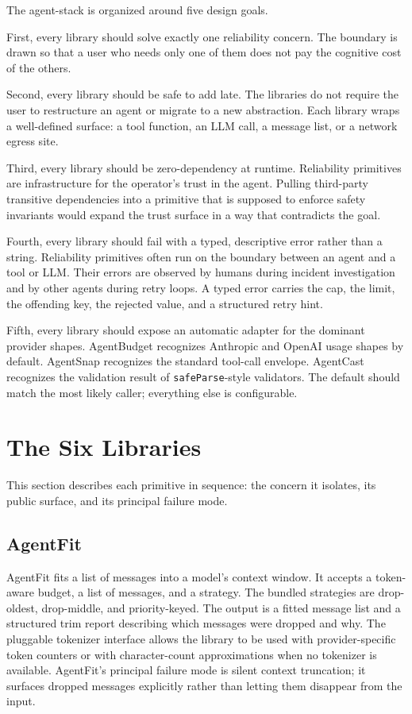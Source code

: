 \documentclass[11pt]{article}
\begin{document}
The agent-stack is organized around five design goals.

First, every library should solve exactly one reliability concern. The boundary is drawn so that a user who needs only one of them does not pay the cognitive cost of the others.

Second, every library should be safe to add late. The libraries do not require the user to restructure an agent or migrate to a new abstraction. Each library wraps a well-defined surface: a tool function, an LLM call, a message list, or a network egress site.

Third, every library should be zero-dependency at runtime. Reliability primitives are infrastructure for the operator's trust in the agent. Pulling third-party transitive dependencies into a primitive that is supposed to enforce safety invariants would expand the trust surface in a way that contradicts the goal.

Fourth, every library should fail with a typed, descriptive error rather than a string. Reliability primitives often run on the boundary between an agent and a tool or LLM. Their errors are observed by humans during incident investigation and by other agents during retry loops. A typed error carries the cap, the limit, the offending key, the rejected value, and a structured retry hint.

Fifth, every library should expose an automatic adapter for the dominant provider shapes. AgentBudget recognizes Anthropic and OpenAI usage shapes by default. AgentSnap recognizes the standard tool-call envelope. AgentCast recognizes the validation result of \texttt{safeParse}-style validators. The default should match the most likely caller; everything else is configurable.

\section{The Six Libraries}


This section describes each primitive in sequence: the concern it isolates, its public surface, and its principal failure mode.

\subsection{AgentFit}


AgentFit fits a list of messages into a model's context window. It accepts a token-aware budget, a list of messages, and a strategy. The bundled strategies are drop-oldest, drop-middle, and priority-keyed. The output is a fitted message list and a structured trim report describing which messages were dropped and why. The pluggable tokenizer interface allows the library to be used with provider-specific token counters or with character-count approximations when no tokenizer is available. AgentFit's principal failure mode is silent context truncation; it surfaces dropped messages explicitly rather than letting them disappear from the input.
\end{document}
